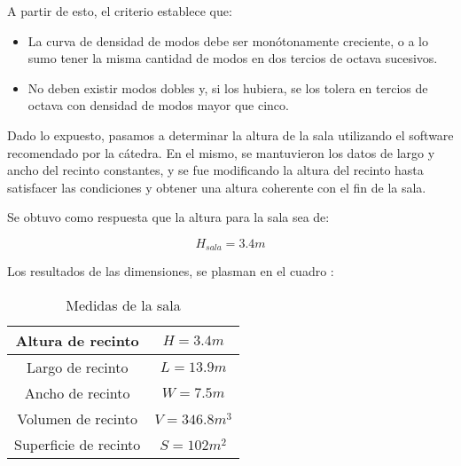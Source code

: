 \par A partir de esto, el criterio establece que:

\begin{itemize}
    \item La curva de densidad de modos debe ser monótonamente creciente, o a lo sumo tener la misma cantidad de modos en dos tercios de octava sucesivos.
    \item No deben existir modos dobles y, si los hubiera, se los tolera en tercios de octava con densidad de modos mayor que cinco.
\end{itemize}

\par Dado lo expuesto, pasamos a determinar la altura de la sala utilizando el software  recomendado por la cátedra. En el mismo, se mantuvieron los datos de largo y ancho del recinto constantes, y se fue modificando la altura del recinto hasta satisfacer las condiciones y obtener una altura coherente con el fin de la sala.

\par Se obtuvo como respuesta que la altura para la sala sea de:

\begin{equation}
    \boxed{ H_{sala} = 3.4m }
\end{equation}

\par Los resultados de las dimensiones, se plasman en el cuadro :

\begin{table}[]
\setlength\arrayrulewidth{1pt}
    \centering
    \begin{tabular}{|c|c|} \hline
        Altura de recinto & $H = 3.4m$ \\ \hline
        Largo de recinto  & $L = 13.9m$\\ \hline
        Ancho de recinto & $W = 7.5m$ \\ \hline
        Volumen de recinto & $V = 346.8 m^3$ \\ \hline
        Superficie de recinto & $S = 102m^2$\\ \hline
    \end{tabular}
    \caption{Medidas de la sala}
    \label{tab:medidas_de_sala}
\end{table}


